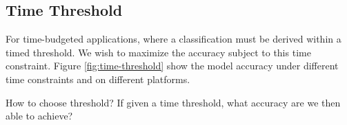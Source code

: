 \subsection{Time Threshold}

For time-budgeted applications, where a classification must be derived within a timed threshold. We wish to maximize the accuracy subject to this time constraint. Figure \ref{fig:time-threshold} show the model accuracy under different time constraints and on different platforms.

How to choose threshold?
If given a time threshold, what accuracy are we then able to achieve? 

\begin{figure}
	\captionsetup[subfigure]{justification=centering}
	\centering
	\hfill
	\hfill

\end{figure}

